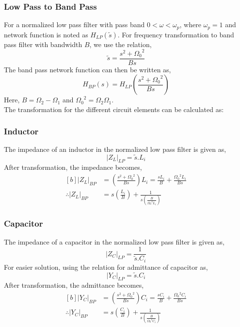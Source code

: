 \documentclass{lab_sheet}
\begin{document}
\subsubsection{Low Pass to Band Pass}
For a normalized low pass filter with pass band $0<\omega<\omega_p$, where $\omega_p=1$ and network function is noted as $H_{LP}(\tilde{s})$. For frequency transformation to band pass filter with bandwidth $B$, we use the relation,
$$
\tilde{s}=\frac{s^2+{\Omega_0}^2}{Bs}
$$
The band pass network function can then be written as,
\begin{equation}
   H_{BP}(s)=H_{LP}\left(\frac{s^2+{\Omega_0}^2}{Bs}\right)
   \label{eqn:bp}
\end{equation}
Here, $B=\Omega_2-\Omega_1$ and ${\Omega_0}^2=\Omega_2\Omega_1$.\\
The transformation for the different circuit elements can be calculated as:
\subsubsection*{Inductor}
The impedance of an inductor in the normalized low pass filter is given as, 
$$
|Z_L|_{LP}=\tilde{s}.L_{i}
$$
After transformation, the impedance becomes,
\begin{equation}
   \begin{aligned}[b]
      |Z_L|_{BP}&=\left(\frac{s^2+{\Omega_0}^2}{Bs}\right)L_i =\frac{sL_i}{B}+\frac{{\Omega_0}^2L_i}{Bs}\\
       \therefore |Z_L|_{BP}&=s\left(\frac{L_i}{B}\right)+\frac{1}{s\left(\frac{B}{{\Omega_0}^2L_i}\right)}
   \end{aligned}
   \label{eqn:l_bp}
\end{equation}

\subsubsection*{Capacitor}
The impedance of a capacitor in the normalized low pass filter is given as, 
$$
|Z_C|_{LP}=\frac{1}{\tilde{s}.C_{i}}
$$
For easier solution, using the relation for admittance of capacitor as,
$$
|Y_C|_{LP}=\tilde{s}.C_{i}
$$
After transformation, the admittance becomes,
\begin{equation}
   \begin{aligned}[b]
      |Y_C|_{BP}&=\left(\frac{s^2+{\Omega_0}^2}{Bs}\right)C_{i}=\frac{sC_i}{B}+\frac{{\Omega_0}^2C_i}{Bs}\\
      \therefore |Y_C|_{BP}&=s\left(\frac{C_i}{B}\right)+\frac{1}{s\left(\frac{B}{{\Omega_0}^2C_i}\right)}
   \end{aligned}
   \label{eqn:c_bp}
\end{equation}
\end{document}
